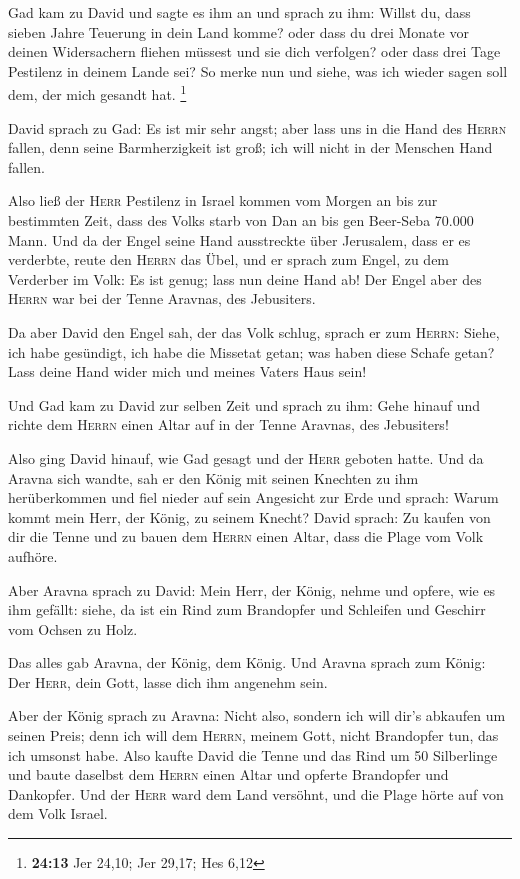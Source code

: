  Gad kam zu David und sagte es ihm an und sprach zu ihm:
Willst du, dass sieben Jahre Teuerung in dein Land komme? oder dass du
drei Monate vor deinen Widersachern fliehen müssest und sie dich
verfolgen? oder dass drei Tage Pestilenz in deinem Lande sei? So merke
nun und siehe, was ich wieder sagen soll dem, der mich gesandt hat.
\footnote{\textbf{24:13} Jer 24,10; Jer 29,17; Hes 6,12}

 David sprach zu Gad: Es ist mir sehr angst; aber lass
uns in die Hand des \textsc{Herrn} fallen, denn seine Barmherzigkeit ist
groß; ich will nicht in der Menschen Hand fallen.

 Also ließ der \textsc{Herr} Pestilenz in Israel kommen
vom Morgen an bis zur bestimmten Zeit, dass des Volks starb von Dan an
bis gen Beer-Seba 70.000 Mann.  Und da der Engel seine
Hand ausstreckte über Jerusalem, dass er es verderbte, reute den
\textsc{Herrn} das Übel, und er sprach zum Engel, zu dem Verderber im
Volk: Es ist genug; lass nun deine Hand ab! Der Engel aber des
\textsc{Herrn} war bei der Tenne Aravnas, des Jebusiters.

 Da aber David den Engel sah, der das Volk schlug, sprach
er zum \textsc{Herrn}: Siehe, ich habe gesündigt, ich habe die Missetat
getan; was haben diese Schafe getan? Lass deine Hand wider mich und
meines Vaters Haus sein!

 Und Gad kam zu David zur selben Zeit und sprach zu ihm:
Gehe hinauf und richte dem \textsc{Herrn} einen Altar auf in der Tenne
Aravnas, des Jebusiters!

 Also ging David hinauf, wie Gad gesagt und der
\textsc{Herr} geboten hatte.  Und da Aravna sich wandte,
sah er den König mit seinen Knechten zu ihm herüberkommen und fiel
nieder auf sein Angesicht zur Erde  und sprach: Warum
kommt mein Herr, der König, zu seinem Knecht? David sprach: Zu kaufen
von dir die Tenne und zu bauen dem \textsc{Herrn} einen Altar, dass die
Plage vom Volk aufhöre.

 Aber Aravna sprach zu David: Mein Herr, der König, nehme
und opfere, wie es ihm gefällt: siehe, da ist ein Rind zum Brandopfer
und Schleifen und Geschirr vom Ochsen zu Holz.

 Das alles gab Aravna, der König, dem König. Und Aravna
sprach zum König: Der \textsc{Herr}, dein Gott, lasse dich ihm angenehm
sein.

 Aber der König sprach zu Aravna: Nicht also, sondern ich
will dir's abkaufen um seinen Preis; denn ich will dem \textsc{Herrn},
meinem Gott, nicht Brandopfer tun, das ich umsonst habe. Also kaufte
David die Tenne und das Rind um 50 Silberlinge  und baute
daselbst dem \textsc{Herrn} einen Altar und opferte Brandopfer und
Dankopfer. Und der \textsc{Herr} ward dem Land versöhnt, und die Plage
hörte auf von dem Volk Israel.
